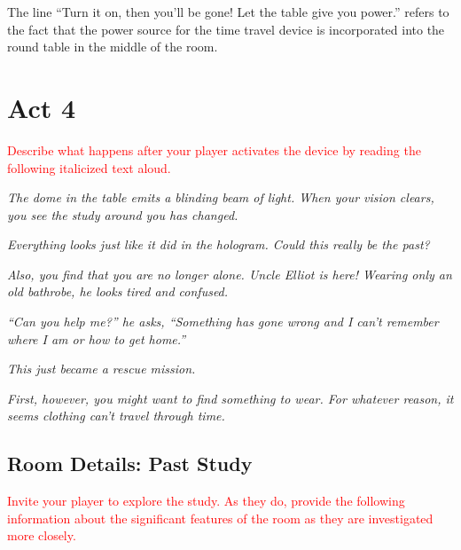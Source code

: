 \documentclass[a6paper, parskip=half, DIV=14, 12pt]{scrartcl}
\begin{document}
The line ``Turn it on, then you'll be gone! Let the table give you power.'' refers to the fact that the power source for the time travel device is incorporated into the round table in the middle of the room. 

\newpage

\section*{Act 4}
\textcolor{Red}{Describe what happens after your player activates the device by reading the following italicized text aloud. }

\textit{The dome in the table emits a blinding beam of light. When your vision clears, you see the study around you has changed.}

\textit{Everything looks just like it did in the hologram. Could this really be the past?}

\textit{Also, you find that you are no longer alone. Uncle Elliot is here! Wearing only an old bathrobe, he looks tired and confused.}

\textit{``Can you help me?'' he asks, ``Something has gone wrong and I can't remember where I am or how to get home.''}

\textit{This just became a rescue mission.}

\textit{First, however, you might want to find something to wear. For whatever reason, it seems clothing can't travel through time.}

\newpage

\subsection*{Room Details: Past Study}
\textcolor{Red}{Invite your player to explore the study. As they do, provide the following information about the significant features of the room as they are investigated more closely.}
\end{document}
